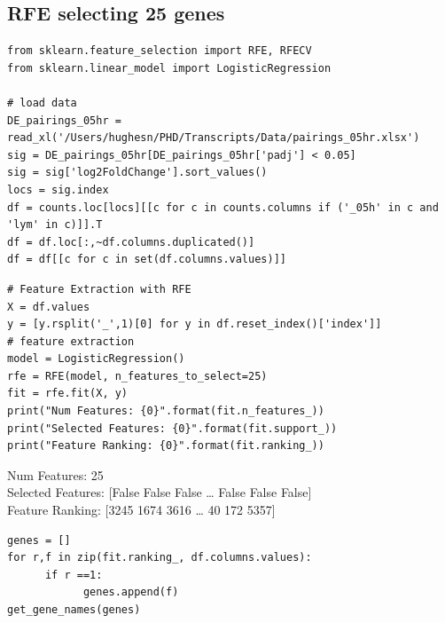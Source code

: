 \documentclass[11pt]{article}
\begin{document}
\subsection{RFE selecting 25 genes}
\label{sec:org944216a}
\begin{verbatim}
from sklearn.feature_selection import RFE, RFECV
from sklearn.linear_model import LogisticRegression

# load data
DE_pairings_05hr = read_xl('/Users/hughesn/PHD/Transcripts/Data/pairings_05hr.xlsx')
sig = DE_pairings_05hr[DE_pairings_05hr['padj'] < 0.05]
sig = sig['log2FoldChange'].sort_values()
locs = sig.index
df = counts.loc[locs][[c for c in counts.columns if ('_05h' in c and 'lym' in c)]].T
df = df.loc[:,~df.columns.duplicated()]
df = df[[c for c in set(df.columns.values)]]
\end{verbatim}

\begin{verbatim}
# Feature Extraction with RFE
X = df.values
y = [y.rsplit('_',1)[0] for y in df.reset_index()['index']]
# feature extraction
model = LogisticRegression()
rfe = RFE(model, n_features_to_select=25)
fit = rfe.fit(X, y)
print("Num Features: {0}".format(fit.n_features_))
print("Selected Features: {0}".format(fit.support_))
print("Feature Ranking: {0}".format(fit.ranking_))
\end{verbatim}

Num Features: 25\\
Selected Features: [False False False \ldots{} False False False]\\
Feature Ranking: [3245 1674 3616 \ldots{}   40  172 5357]\\


\begin{verbatim}
genes = []
for r,f in zip(fit.ranking_, df.columns.values):
      if r ==1:
            genes.append(f)
get_gene_names(genes)
\end{verbatim}
\end{document}
